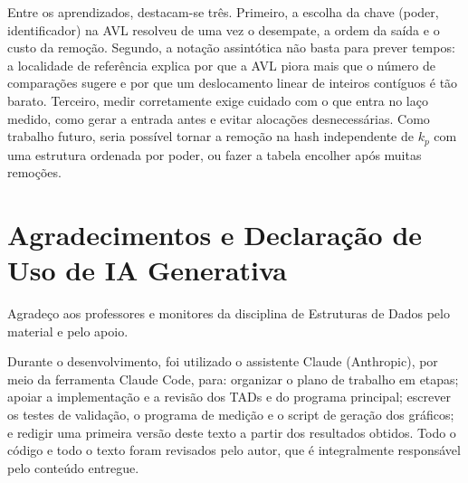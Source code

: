 \documentclass[letterpaper]{article} %
\begin{document}
Entre os aprendizados, destacam-se tr\^es. Primeiro, a escolha da chave (poder, identificador) na AVL resolveu de uma vez o desempate, a ordem da sa\'ida e o custo da remo\c{c}\~ao. Segundo, a nota\c{c}\~ao assint\'otica n\~ao basta para prever tempos: a localidade de refer\^encia explica por que a AVL piora mais que o n\'umero de compara\c{c}\~oes sugere e por que um deslocamento linear de inteiros cont\'iguos \'e t\~ao barato. Terceiro, medir corretamente exige cuidado com o que entra no la\c{c}o medido, como gerar a entrada antes e evitar aloca\c{c}\~oes desnecess\'arias. Como trabalho futuro, seria poss\'ivel tornar a remo\c{c}\~ao na hash independente de $k_p$ com uma estrutura ordenada por poder, ou fazer a tabela encolher ap\'os muitas remo\c{c}\~oes.

\section{Agradecimentos e Declara\c{c}\~ao de Uso de IA Generativa}

Agrade\c{c}o aos professores e monitores da disciplina de Estruturas de Dados pelo material e pelo apoio.

Durante o desenvolvimento, foi utilizado o assistente Claude (Anthropic), por meio da ferramenta Claude Code, para: organizar o plano de trabalho em etapas; apoiar a implementa\c{c}\~ao e a revis\~ao dos TADs e do programa principal; escrever os testes de valida\c{c}\~ao, o programa de medi\c{c}\~ao e o script de gera\c{c}\~ao dos gr\'aficos; e redigir uma primeira vers\~ao deste texto a partir dos resultados obtidos. Todo o c\'odigo e todo o texto foram revisados pelo autor, que \'e integralmente respons\'avel pelo conte\'udo entregue.
\end{document}
